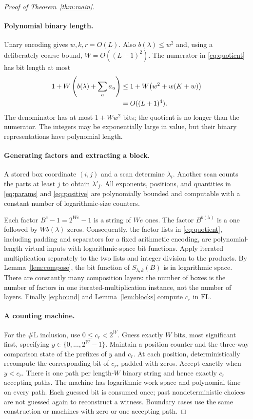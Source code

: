 \documentclass[11pt]{article}
\newcommand{\FL}{\mathrm{FL}}
\newcommand{\sharpL}{\#\mathrm L}
\begin{document}
\begin{proof}[Proof of Theorem~\ref{thm:main}]
\paragraph{Polynomial binary length.}
Unary encoding gives $w,k,r=O(L)$. Also $b(\lambda)\leq w^2$ and,
using a deliberately coarse bound, $W=O((L+1)^2)$. The numerator in
\eqref{eq:quotient} has bit length at most
\begin{align}\label{eq:length}
1+W\left(b(\lambda)+\sum_u a_u\right)
&\leq1+W\bigl(w^2+w(K+w)\bigr)\notag\\
&=O((L+1)^4).
\end{align}
The denominator has at most $1+Ww^2$ bits; the quotient is no longer
than the numerator. The integers may be exponentially large in value,
but their binary representations have polynomial length.

\paragraph{Generating factors and extracting a block.}
A stored box coordinate $(i,j)$ and a scan determine $\lambda_i$.
Another scan counts the parts at least $j$ to obtain $\lambda'_j$.
All exponents, positions, and quantities in \eqref{eq:params} and
\eqref{eq:positive} are polynomially bounded and computable with a
constant number of logarithmic-size counters.

Each factor $B^e-1=2^{We}-1$ is a string of $We$ ones.
The factor $B^{b(\lambda)}$ is a one followed by $Wb(\lambda)$ zeros.
Consequently, the factor lists in \eqref{eq:quotient}, including padding
and separators for a fixed arithmetic encoding, are polynomial-length
virtual inputs with logarithmic-space bit functions. Apply iterated
multiplication separately to the two lists and integer division to the
products. By Lemma~\ref{lem:compose}, the bit function of
$S_{\lambda,k}(B)$ is in logarithmic space. There are constantly many
composition layers: the number of boxes is the number of factors in
one iterated-multiplication instance, not the number of layers.
Finally \eqref{eq:bound} and Lemma~\ref{lem:blocks} compute $c_r$ in $\FL$.

\paragraph{A counting machine.}
For the $\sharpL$ inclusion, use $0\leq c_r<2^W$. Guess exactly $W$
bits, most significant first, specifying $y\in\{0,\ldots,2^W-1\}$.
Maintain a position counter and the three-way comparison state of the
prefixes of $y$ and $c_r$. At each position, deterministically recompute
the corresponding bit of $c_r$, padded with zeros. Accept exactly when
$y<c_r$. There is one path per length-$W$ binary string and hence exactly
$c_r$ accepting paths. The machine has logarithmic work space and
polynomial time on every path. Each guessed bit is consumed once;
past nondeterministic choices are not guessed again to reconstruct a
witness. Boundary cases use the same construction or machines with
zero or one accepting path.
\end{proof}
\end{document}
